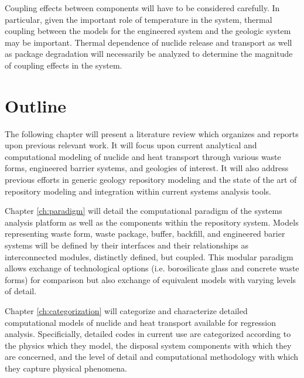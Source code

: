 Coupling effects between components will have to be considered 
carefully.  In particular, given the important role of temperature in 
the system, thermal coupling between the models for the engineered 
system and the geologic system may be important. Thermal dependence of 
nuclide release and transport as well as package degradation will 
necessarily be analyzed to determine the magnitude of coupling effects 
in the system.


\section{Outline}

The following chapter will present a literature review which organizes 
and reports upon previous relevant work. It will focus upon current 
analytical and computational modeling of nuclide and heat transport 
through various waste forms, engineered barrier systems, and geologies 
of interest. It will also address previous efforts in generic geology 
repository modeling and the state of the art of repository modeling 
and integration within current systems analysis tools. 

Chapter \ref{ch:paradigm} will detail the computational paradigm of 
the \Cyclus systems analysis platform as well as the components within 
the repository system. Models
representing waste form, waste package, buffer, backfill, and 
engineered barier systems will be defined by their interfaces and 
their relationships as interconnected modules, distinctly defined, but 
coupled. This modular paradigm allows exchange  of technological 
options (i.e. borosilicate glass and concrete waste forms) for 
comparison but also exchange of equivalent models with varying levels 
of detail.


Chapter \ref{ch:categorization} will categorize and characterize 
detailed computational models of nuclide and heat transport available 
for regression analysis. Specificially, detailed codes in current use 
are categorized according to the physics which they model, the 
disposal system components with which they are concerned, and the 
level of detail and computational methodology with which they capture 
physical phenomena. 

